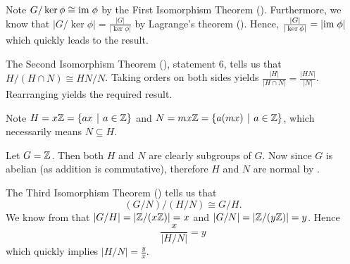 \begin{questions}
    \item Note $G / \ker \phi \cong \mathrm{im}\; \phi$ by the First Isomorphism Theorem (). Furthermore, we know that $|G / \ker \phi| = \frac{|G|}{|\ker\phi|}$ by Lagrange's theorem (). Hence, $\frac{|G|}{|\ker\phi|} = |\mathrm{im}\;\phi|$ which quickly leads to the result.

    \item The Second Isomorphism Theorem (), statement 6, tells us that $H / (H\cap N) \cong HN / N$. Taking orders on both sides yields $\frac{|H|}{|H \cap N|} = \frac{|HN|}{|N|}$. Rearranging yields the required result.

    \item \begin{partquestions}{\roman*}
        \item Note $H = x\Z = \{ax \vert a \in \Z\}$ and $N = mx\Z = \{a(mx) \vert a \in \Z\}$, which necessarily means $N \subseteq H$.
        \item Let $G = \mathbb{Z}$. Then both $H$ and $N$ are clearly subgroups of $G$. Now since $G$ is abelian (as addition is commutative), therefore $H$ and $N$ are normal by .
        \item The Third Isomorphism Theorem () tells us that
        \[
            (G/N)/(H/N) \cong G/H.
        \]
        We know from  that $|G/H| = |\mathbb{Z}/(x\mathbb{Z})| = x$ and $|G/N| = |\mathbb{Z}/(y\mathbb{Z})| = y$. Hence
        \[
            \frac{x}{|H/N|} = y
        \]
        which quickly implies $|H/N| = \frac yx$.
    \end{partquestions}
\end{questions}

